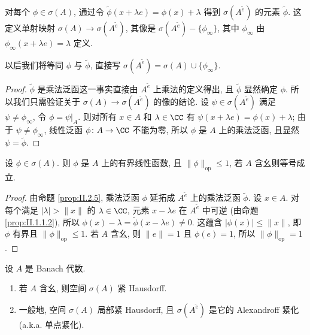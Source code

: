 \begin{proposition}[谱的嵌入]
\label{prop:II.2.5}
对每个 $\phi \in \sigma(A)$, 通过令 $\tilde{\phi}(x + \lambda e) = \phi(x) + \lambda$ 得到 $\sigma(A^{\tilde{e}})$ 的元素 $\tilde{\phi}$. 这定义单射映射 $\sigma(A) \to \sigma(A^{\tilde{e}})$, 其像是 $\sigma(A^{\tilde{e}}) - \{\phi_{\infty}\}$, 其中 $\phi_{\infty}$ 由 $\phi_{\infty}(x + \lambda e) = \lambda$ 定义.
\end{proposition}

以后我们将等同 $\phi$ 与 $\tilde{\phi}$, 直接写 $\sigma(A^{\tilde{e}}) = \sigma(A) \cup \{\phi_{\infty}\}$.

\begin{proof}
$\tilde{\phi}$ 是乘法泛函这一事实直接由 $A^{\tilde{e}}$ 上乘法的定义得出, 且 $\tilde{\phi}$ 显然确定 $\phi$. 所以我们只需验证关于 $\sigma(A) \to \sigma(A^{\tilde{e}})$ 的像的结论.
设 $\psi \in \sigma(A^{\tilde{e}})$ 满足 $\psi \neq \phi_{\infty}$, 令 $\phi = \psi|_A$. 则对所有 $x \in A$ 和 $\lambda \in \CC$ 有 $\psi(x + \lambda e) = \phi(x) + \lambda$; 由于 $\psi \neq \phi_{\infty}$, 线性泛函 $\phi \colon A \to \CC$ 不能为零, 所以 $\phi$ 是 $A$ 上的乘法泛函, 且显然 $\psi = \tilde{\phi}$.
\end{proof}

\begin{corollary}[乘法泛函自动有界]
\label{cor:II.2.6}
设 $\phi \in \sigma(A)$. 则 $\phi$ 是 $A$ 上的有界线性函数, 且 $\|\phi\|_{\mathrm{op}} \leq 1$, 若 $A$ 含幺则等号成立.
\end{corollary}

\begin{proof}
由命题 \ref{prop:II.2.5}, 乘法泛函 $\phi$ 延拓成 $A^{\tilde{e}}$ 上的乘法泛函 $\tilde{\phi}$. 设 $x \in A$. 对每个满足 $|\lambda| > \|x\|$ 的 $\lambda \in \CC$, 元素 $x - \lambda e$ 在 $A^{\tilde{e}}$ 中可逆 (由命题 \ref{prop:II.1.1.2}), 所以 $\phi(x) - \lambda = \tilde{\phi}(x - \lambda e) \neq 0$. 这蕴含 $|\phi(x)| \leq \|x\|$, 即 $\phi$ 有界且 $\|\phi\|_{\mathrm{op}} \leq 1$.
若 $A$ 含幺, 则 $\|e\| = 1$ 且 $\phi(e) = 1$, 所以 $\|\phi\|_{\mathrm{op}} = 1$.
\end{proof}

\begin{theorem}[谱的紧致性]
\label{thm:II.2.7}
设 $A$ 是 Banach 代数.
\begin{enumerate}
\item[(i)] 若 $A$ 含幺, 则空间 $\sigma(A)$ 紧 Hausdorff.
\item[(ii)] 一般地, 空间 $\sigma(A)$ 局部紧 Hausdorff, 且 $\sigma(A^{\tilde{e}})$ 是它的 Alexandroff 紧化 (a.k.a. 单点紧化).
\end{enumerate}
\end{theorem}

